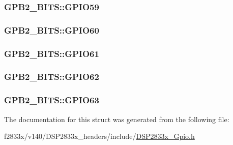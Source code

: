 \subsubsection[{G\+P\+I\+O59}]{ G\+P\+B2\+\_\+\+B\+I\+T\+S\+::\+G\+P\+I\+O59}\label{struct_g_p_b2___b_i_t_s_a3a6bd9723e030d8747ebf5550be2f315}
\hypertarget{struct_g_p_b2___b_i_t_s_ab528811be87bab181c54614071ddde20}{}
\subsubsection[{G\+P\+I\+O60}]{ G\+P\+B2\+\_\+\+B\+I\+T\+S\+::\+G\+P\+I\+O60}\label{struct_g_p_b2___b_i_t_s_ab528811be87bab181c54614071ddde20}
\hypertarget{struct_g_p_b2___b_i_t_s_af8de085ba17595d7021db0aac1535f8c}{}
\subsubsection[{G\+P\+I\+O61}]{ G\+P\+B2\+\_\+\+B\+I\+T\+S\+::\+G\+P\+I\+O61}\label{struct_g_p_b2___b_i_t_s_af8de085ba17595d7021db0aac1535f8c}
\hypertarget{struct_g_p_b2___b_i_t_s_ab9866e357590729ca537e8cddc2ccf1a}{}
\subsubsection[{G\+P\+I\+O62}]{ G\+P\+B2\+\_\+\+B\+I\+T\+S\+::\+G\+P\+I\+O62}\label{struct_g_p_b2___b_i_t_s_ab9866e357590729ca537e8cddc2ccf1a}
\hypertarget{struct_g_p_b2___b_i_t_s_a0b447fc0dae001d71a65a7125084ea29}{}
\subsubsection[{G\+P\+I\+O63}]{ G\+P\+B2\+\_\+\+B\+I\+T\+S\+::\+G\+P\+I\+O63}\label{struct_g_p_b2___b_i_t_s_a0b447fc0dae001d71a65a7125084ea29}


The documentation for this struct was generated from the following file\+:\begin{DoxyCompactItemize}
\item 
f2833x/v140/\+D\+S\+P2833x\+\_\+headers/include/\hyperlink{_d_s_p2833x___gpio_8h}{D\+S\+P2833x\+\_\+\+Gpio.\+h}\end{DoxyCompactItemize}
